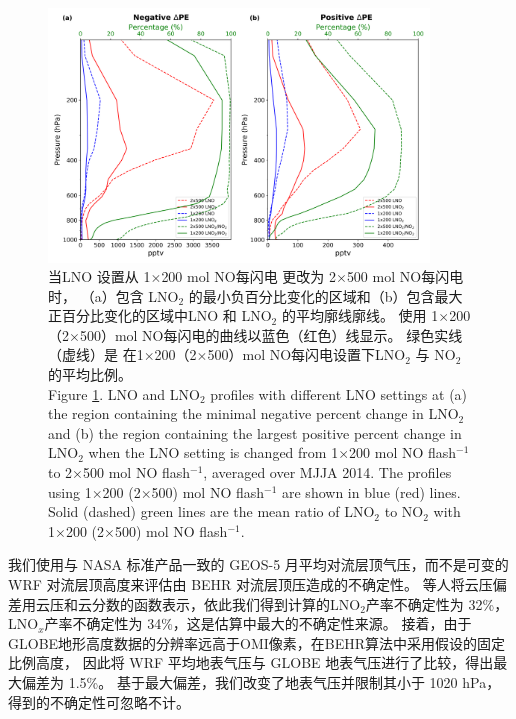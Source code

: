 \begin{figure}[H]
\centering
\includegraphics[width=0.9\textwidth]{./figures/us_lno2_profile.png}
\caption{当LNO 设置从 1$\times$200 mol NO每闪电 更改为 2$\times$500 mol NO每闪电 时，
（a）包含 LNO$_2$ 的最小负百分比变化的区域和（b）包含最大正百分比变化的区域中LNO 和 LNO$_2$ 的平均廓线廓线。
使用 1$\times$200（2$\times$500）mol NO每闪电的曲线以蓝色（红色）线显示。
绿色实线（虚线）是 在1$\times$200（2$\times$500）mol NO每闪电设置下LNO$_2$ 与 NO$_2$ 的平均比例。\\
Figure \ref{fig:us_lno2_profile}. LNO and LNO$_2$ profiles with different LNO settings at (a) the region containing the minimal negative percent change in LNO$_2$ and (b) the region containing the largest positive percent change in LNO$_2$ when the LNO setting is changed from 1$\times$200 mol NO flash$^{-1}$ to 2$\times$500 mol NO flash$^{-1}$, averaged over MJJA 2014.
The profiles using 1$\times$200 (2$\times$500) mol NO flash$^{-1}$ are shown in blue (red) lines.
Solid (dashed) green lines are the mean ratio of LNO$_2$ to NO$_2$ with 1$\times$200 (2$\times$500) mol NO flash$^{-1}$.}
\label{fig:us_lno2_profile}
\end{figure}


我们使用与 NASA 标准产品一致的 GEOS-5 月平均对流层顶气压，而不是可变的 WRF 对流层顶高度来评估由 BEHR 对流层顶压造成的不确定性。
\citet{Acarreta.2004}等人将云压偏差用云压和云分数的函数表示，依此我们得到计算的LNO$_2$产率不确定性为 32\%，
LNO$_x$产率不确定性为 34\%，这是估算中最大的不确定性来源。
接着，由于GLOBE地形高度数据的分辨率远高于OMI像素，在BEHR算法中采用假设的固定比例高度，
因此\citet{Laughner.2019a}将 WRF 平均地表气压与 GLOBE 地表气压进行了比较，得出最大偏差为 1.5\%。
基于最大偏差，我们改变了地表气压并限制其小于 1020 hPa，得到的不确定性可忽略不计。

